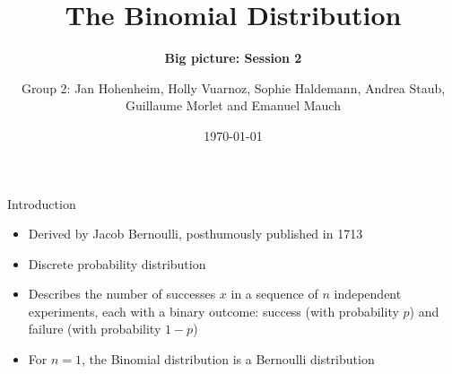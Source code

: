 \documentclass[english]{beamer}\usepackage[]{graphicx}\usepackage[]{xcolor}
\title[The Binomial Distribution]{The Binomial Distribution}
\subtitle{\textbf{Big picture: Session 2}}
\author{Group 2: Jan Hohenheim, Holly Vuarnoz, Sophie Haldemann,
Andrea Staub, Guillaume Morlet and Emanuel Mauch}
\date{\today}
\begin{document}
\maketitle


\begin{frame}{Introduction}

\begin{itemize}

\item Derived by Jacob Bernoulli, posthumously published in 1713
\item Discrete probability distribution
\item Describes the \textcolor{mylinkcolor}{number of successes $x$} in a sequence of
\textcolor{mylinkcolor}{$n$ independent experiments}, each with a binary outcome:
success (with probability $p$) and failure (with probability $1-p$)
\item For $n=1$, the Binomial distribution is a Bernoulli distribution

\end{itemize}

\end{frame}
\end{document}
